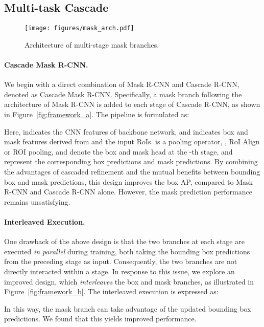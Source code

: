 \documentclass[10pt,twocolumn,letterpaper]{article}
\begin{document}
\subsection{Multi-task Cascade}
\label{subsec:multi-task}

\begin{figure}
	\centering
	\texttt{[image: figures/mask\_arch.pdf]}
	\caption{Architecture of multi-stage mask branches.}
	\label{fig:mask-arch}
\end{figure}

\paragraph{Cascade Mask R-CNN.}
We begin with a direct combination of Mask R-CNN and Cascade R-CNN,
denoted as Cascade Mask R-CNN. Specifically, a mask branch following the
architecture of Mask R-CNN is added to each stage of Cascade R-CNN, as shown in
Figure~\ref{fig:framework_a}.
The pipeline is formulated as:

Here,  indicates the CNN features of backbone network,
 and  indicates box and mask features derived from
 and the input RoIs.
 is a pooling operator, \eg, RoI Align or ROI pooling,
 and  denote the box and mask head at the -th stage,
 and  represent the corresponding box predictions and
mask predictions.
By combining the advantages of cascaded refinement and the mutual benefits
between bounding box and mask predictions, this design improves
the box AP, compared to Mask R-CNN and Cascade R-CNN alone.
However, the mask prediction performance remains unsatisfying.

\vspace{-7pt}
\paragraph{Interleaved Execution.}
One drawback of the above design is that the two branches at each stage
are executed \emph{in parallel} during training, both taking the bounding box predictions
from the preceding stage as input. Consequently, the two branches are not
directly interacted within a stage.
In response to this issue, we explore an improved design, which
\emph{interleaves} the box and mask branches, as illustrated in
Figure~\ref{fig:framework_b}.
The interleaved execution is expressed as:

In this way, the mask branch can take advantage of the updated
bounding box predictions. We found that this yields improved performance.
\end{document}
